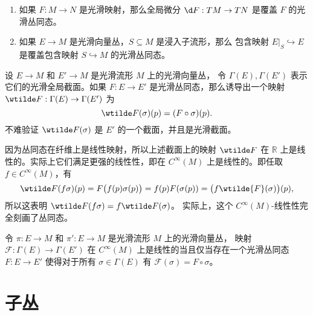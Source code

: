 \begin{example}[丛同态]
  \mbox{}
  \begin{enumerate}
    \item 如果 $F:M\to N$ 是光滑映射，那么全局微分 $\d F:TM\to TN$
    是覆盖 $F$ 的光滑丛同态。
    \item 如果 $E\to M$ 是光滑向量丛，$S\subseteq M$ 是浸入子流形，那么
    包含映射 $E|_S\hookrightarrow E$ 是覆盖包含映射 $S\hookrightarrow M$
    的光滑丛同态。
  \end{enumerate}
\end{example}

设 $E\to M$ 和 $E'\to M$ 是光滑流形 $M$ 上的光滑向量丛，
令 $\Gamma(E),\Gamma(E')$ 表示它们的光滑全局截面。如果
$F:E\to E'$ 是光滑丛同态，那么诱导出一个映射 $\wtilde F:\Gamma(E)\to\Gamma(E')$
为
\begin{equation}
  \wtilde F(\sigma)(p)=(F\circ\sigma)(p).
\end{equation}
不难验证 $\wtilde F(\sigma)$ 是 $E'$ 的一个截面，并且是光滑截面。

因为丛同态在纤维上是线性映射，所以上述截面上的映射 $\wtilde F$ 在
$\mathbb{R}$ 上是线性的。实际上它们满足更强的线性性，即在 $C^\infty(M)$
上是线性的。即任取 $f\in C^\infty(M)$，有
\[
  \wtilde F(f\sigma)(p)=F\bigl(f(p)\sigma(p)\bigr)
  =f(p)F(\sigma(p))=\bigl(f\wtilde{F}(\sigma)\bigr)(p),
\]
所以这表明 $\wtilde F(f\sigma)=f\wtilde F(\sigma)$。
实际上，这个 $C^\infty(M)$-线性性完全刻画了丛同态。

\begin{lemma}[丛同态表征引理]
  令 $\pi:E\to M$ 和 $\pi':E\to M$ 是光滑流形 $M$ 上的光滑向量丛，
  映射 $\mathcal{F}:\Gamma(E)\to\Gamma(E')$ 在 $C^\infty(M)$
  上是线性的当且仅当存在一个光滑丛同态 $F:E\to E'$
  使得对于所有 $\sigma\in\Gamma(E)$ 有 $\mathcal{F}(\sigma)=F\circ\sigma$。
\end{lemma}




\section{子丛}


